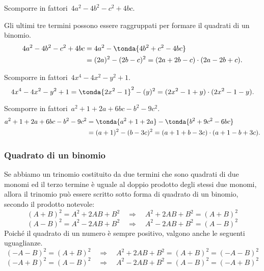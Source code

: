  \begin{esempio}
Scomporre in fattori~\(4a^{2}-4b^{2}-c^{2}+4bc\).

Gli ultimi tre termini possono essere raggruppati per formare il quadrati di 
un binomio.
 \begin{equation*}
   \begin{split}
     4a^{2}-4b^{2}-c^{2}+4bc &=4a^{2}-\tonda{4b^{2}+c^{2}-4bc} \\
                 &= (2a)^{2}-(2b-c)^{2}=(2a+2b-c)\cdot (2a-2b+c).
   \end{split}
  \end{equation*}
 \end{esempio}

 \begin{esempio}
Scomporre in fattori~\(4x^{4}-4x^{2}-y^{2}+1\).
\[4x^{4}-4x^{2}-y^{2}+1=\tonda{2x^{2}-1}^{2}-(y)^{2}=(2x^{2}-1+y)\cdot 
(2x^{2}-1-y).\]
 \end{esempio}

 \begin{esempio}
Scomporre in fattori~\(a^{2}+1+2a+6bc-b^{2}-9c^{2}\).
 \begin{equation*}
   \begin{split}
     a^{2}+1+2a+6bc-b^{2}-9c^{2} 
&=\tonda{a^{2}+1+2a}-\tonda{b^{2}+9c^{2}-6{bc}} \\
                 &= (a+1)^{2}-(b-3c)^{2}=(a+1+b-3c)\cdot (a+1-b+3c).
   \end{split}
  \end{equation*}
 \end{esempio}
% 
\subsubsection{Quadrato di un binomio}
\label{subsubsec:divpol_quadbin}

Se abbiamo un trinomio costituito da due termini che sono quadrati di due 
monomi ed il terzo termine è uguale al doppio prodotto
degli stessi due monomi, allora il trinomio può essere scritto sotto forma di 
quadrato di un binomio, secondo il prodotto notevole:
\[(A+B)^{2}=A^{2}+2AB+B^{2}\quad \Rightarrow \quad 
  A^{2}+2AB+B^{2}=(A+B)^{2}\]
\[(A-B)^{2}=A^{2}-2AB+B^{2}\quad \Rightarrow \quad 
  A^{2}-2AB+B^{2}=(A-B)^{2}\]
Poiché il quadrato di un numero è sempre positivo, valgono anche le seguenti 
uguaglianze.
\[(-A-B)^{2}=(A+B)^{2}\quad\Rightarrow\quad 
  A^{2}+2AB+B^{2}=(A+B)^{2}=(-A-B)^{2}\]
\[(-A+B)^{2}=(A-B)^{2}\quad \Rightarrow \quad 
A^{2}-2AB+B^{2}=(A-B)^{2}=(-A+B)^{2}\]

